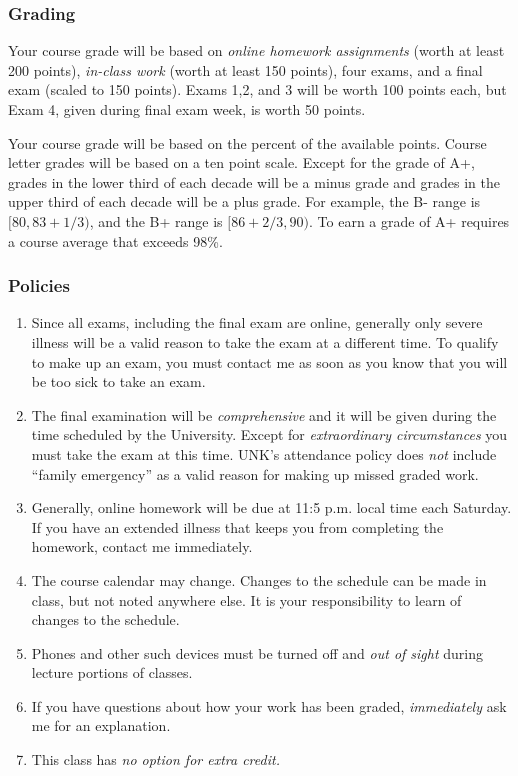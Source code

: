 \documentclass[12pt]{article}
\newcounter{ex}\setcounter{ex}{0}
\newcounter{cy}\setcounter{cy}{\the\year}
\begin{document}
\subsubsection*{Grading}

Your course grade will be based on \emph{online homework assignments} (worth at least 200 points), \emph{in-class work} (worth at least 150 points),  four exams, and a final
exam (scaled to 150 points).   Exams 1,2, and 3 will be worth 100 points each, but Exam 4, given during final exam week, is worth 50 points.

Your course grade will be based on the percent of the available points. Course letter grades will be based on a ten point scale. Except for the grade of A+, grades in the lower third of each decade will be a
minus grade and grades in the upper third of each decade will be a plus grade. For example, the B- range is $[80, 83 + 1/3)$, and the B+ range is $[86 + 2/3, 90)$. To earn a grade of A+ requires a course average that exceeds 98\%.


\subsubsection* {Policies}

\begin{enumerate}


 \item Since all  exams, including the final exam are online, generally only severe  illness will be a valid reason to take the exam at a different time. To qualify to make up an exam, you must contact me as soon as you know that you will be too sick to take an exam.

 \item The final examination will be \emph{comprehensive} and it will be given during the time scheduled by the University. Except for \emph{extraordinary circumstances}
you must take the exam at this time.   UNK's attendance policy  does \emph{not} include ``family emergency'' as a valid reason for making up missed graded work.


 \item Generally, online homework will be due at 11:5 p.m. local time each Saturday. If you have an extended illness that keeps you from completing the homework, contact me immediately.


\item The course calendar may change. Changes to the schedule can be made in class, but not noted anywhere else. It is your responsibility to
learn of changes to the schedule.

\item Phones and other such devices must be turned off and \emph{out of sight} during lecture portions of classes.


\item If you have questions about how your work has been graded,  \emph{immediately}  ask me for an explanation.

\item This class has \emph{no option for extra credit.}

\end{enumerate}
\end{document}
